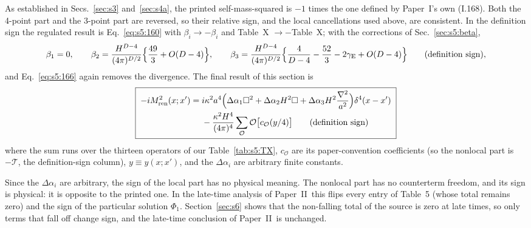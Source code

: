 \documentclass[aps,prd,onecolumn,10pt,nofootinbib,floatfix]{revtex4-2}
\newcommand{\PI}{Paper~I}
\newcommand{\PII}{Paper~II}
\newcommand{\eqI}[1]{(I.#1)}
\newcommand{\Tab}{\mathcal{T}}
\newcommand{\ren}{_{\rm ren}}
\begin{document}
As established in Secs.~\ref{sec:s3} and~\ref{sec:s4a}, the printed self-mass-squared is $-1$ times the one defined by \PI's own \eqI{168}.
Both the 4-point part and the 3-point part are reversed, so their relative sign, and the local cancellations used above, are consistent.
In the definition sign the regulated result is Eq.~\eqref{eq:s5:160} with $\beta_i\to-\beta_i$ and Table~X $\to-$Table~X; with the corrections of Sec.~\ref{sec:s5:beta},
\begin{equation}
\beta_1=0,\qquad
\beta_2=\frac{H^{D-4}}{(4\pi)^{D/2}}\Big\{\frac{49}{3}+O(D-4)\Big\},\qquad
\beta_3=\frac{H^{D-4}}{(4\pi)^{D/2}}\Big\{\frac{4}{D-4}-\frac{52}{3}-2\gamma_{\rm E}+O(D-4)\Big\}\qquad\text{(definition sign)},
\label{eq:s5:betadef}
\end{equation}
and Eq.~\eqref{eq:s5:166} again removes the divergence.
The final result of this section is
\begin{equation}
\boxed{\;
\begin{aligned}
-iM^2\ren(x;x')={}&i\kappa^2a^4\Big(\Delta\alpha_1\square^2+\Delta\alpha_2H^2\square+\Delta\alpha_3H^2\frac{\nabla^2}{a^2}\Big)\delta^4(x-x')\\
&-\frac{\kappa^2H^4}{(4\pi)^4}\sum_{\mathcal O}\mathcal O\big[c_{\mathcal O}(y/4)\big]\qquad\text{(definition sign)}
\end{aligned}\;}
\label{eq:s5:final}
\end{equation}
where the sum runs over the thirteen operators of our Table~\ref{tab:s5:TX}, $c_{\mathcal O}$ are its paper-convention coefficients (so the nonlocal part is $-\Tab$, the definition-sign column), $y\equiv y(x;x')$, and the $\Delta\alpha_i$ are arbitrary finite constants.

Since the $\Delta\alpha_i$ are arbitrary, the sign of the local part has no physical meaning.
The nonlocal part has no counterterm freedom, and its sign is physical: it is opposite to the printed one.
In the late-time analysis of \PII\ this flips every entry of Table~5 (whose total remains zero) and the sign of the particular solution $\Phi_1$.
Section~\ref{sec:s6} shows that the non-falling total of the source is zero at late times, so only terms that fall off change sign, and the late-time conclusion of \PII\ is unchanged.
\end{document}
